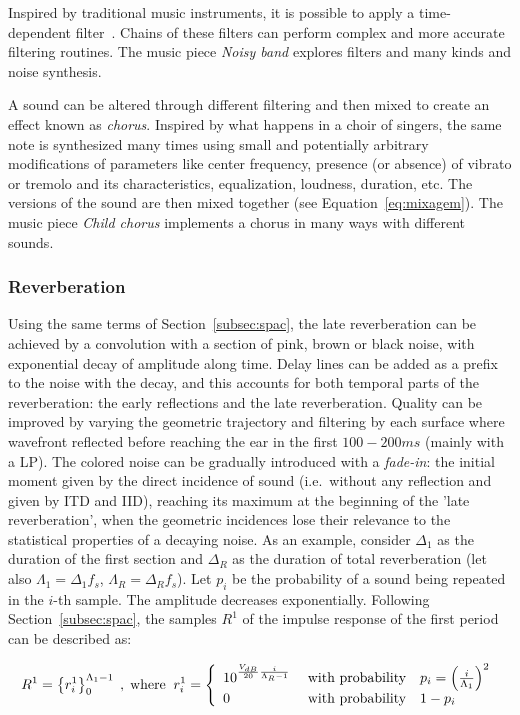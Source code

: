 Inspired by traditional music instruments, it is possible to apply a
time-dependent filter~\cite{Roederer}. Chains of these filters can perform complex and more accurate filtering routines. The music piece \emph{Noisy band} explores filters and many kinds and noise synthesis.~\cite{MASSA}

A sound can be altered through different filtering and then mixed to create an effect known as \emph{chorus}.
Inspired by what happens in a choir of singers, the same note is synthesized many times using small and potentially arbitrary modifications of parameters like center frequency, presence (or absence) of vibrato or tremolo and its characteristics, equalization, loudness, duration, etc.
The versions of the sound are then mixed together (see Equation~\ref{eq:mixagem}).
The music piece \emph{Child chorus} implements a chorus in many ways with different sounds.~\cite{MASSA}

\subsubsection{Reverberation}\label{subsubsec:reverb}
Using the same terms of Section~\ref{subsec:spac}, the
late reverberation can be achieved by a convolution with a section of pink, brown or black noise, with exponential decay of amplitude along time. Delay lines can be added as a prefix to the noise
with the decay, and this accounts for both temporal parts of the reverberation:
the early reflections and the late reverberation.
Quality can be improved by varying the geometric trajectory and filtering by each surface where wavefront reflected before reaching the ear in the first $100-200ms$ (mainly with a LP). The colored noise can be gradually introduced with a \emph{fade-in}: the initial moment given by the direct
incidence of sound (i.e.\ without any reflection and given by ITD and IID), reaching its maximum at the beginning of the 'late
reverberation', when the geometric incidences lose their relevance to the statistical properties of a decaying noise.
As an example, consider $\Delta_1$ as the duration of the first section and $\Delta_R$ as the duration of total reverberation 
(let also $\Lambda_1=\Delta_1 f_s$, $\Lambda_R=\Delta_R
f_s$).
Let $p_i$ be the probability of a sound being repeated in the
$i$-th sample. The amplitude decreases exponentially. Following
Section~\ref{subsec:spac}, the samples $R^1$ of the impulse response of the first period can be described as:

\begin{equation}\label{eq:p1rev}
\begin{split}
	R^1  =\left\{r_i^1\right\}_0^{\Lambda_1-1}\;,\; \text{where}\;\;
	r_i^1  =\left\{
        \begin{array}{l l}
            10^{\frac{V_{dB}}{20}\frac{i}{\Lambda_R-1}}\;  & \text{with probability}\quad p_i=\left(\frac{i}{\Lambda_1}\right)^2 \\
                                     0 \; & \text{with probability}\quad 1-p_i \\
        \end{array} \right.
\end{split}
\end{equation}

